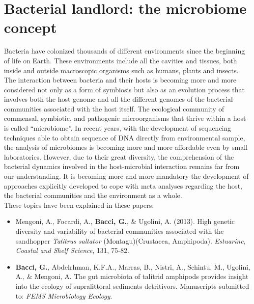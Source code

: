 \logvartrue
\chapter{Bacterial landlord: the microbiome concept}
Bacteria have colonized thousands of different environments since the beginning of life on Earth. These environments include all the cavities and tissues, both inside and outside macroscopic organisms such as humans, plants and insects. The interaction between bacteria and their hosts is becoming more and more considered not only as a form of symbiosis but also as an evolution process that involves both the host genome and all the different genomes of the bacterial communities associated with the host itself. The ecological community of commensal, symbiotic, and pathogenic microorganisms that thrive within a host is called ``microbiome''. In recent years, with the development of sequencing techniques able to obtain sequence of DNA directly from environmental sample, the analysis of microbiomes is becoming more and more affordable even by small laboratories. However, due to their great diversity, the comprehension of the bacterial dynamics involved in the host-microbial interaction remains far from our understanding. It is becoming more and more mandatory the development of approaches explicitly developed to cope with meta analyses regarding the host, the bacterial communities and the environment as a whole.\\
These topics have been explained in these papers:
\vspace{-2mm}
\begin{itemize}
\item Mengoni, A., Focardi, A., \textbf{Bacci, G.}, \& Ugolini, A. (2013). High genetic diversity and variability of bacterial communities associated with the sandhopper \textit{Talitrus saltator} (Montagu)(Crustacea, Amphipoda). \textit{Estuarine, Coastal and Shelf Science}, 131, 75-82.
\item \textbf{Bacci, G.}, Abdelrhman, K.F.A., Marras, B., Nistri, A., Schintu, M., Ugolini, A., \& Mengoni, A. The gut microbiota of talitrid amphipods provides insight into the ecology of supralittoral sediments detritivors. Manuscripts submitted to: \textit{FEMS Microbiology Ecology}.
\end{itemize}

